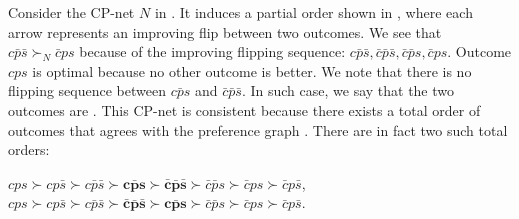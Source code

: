 Consider the CP-net $N$ in .
It induces a partial order shown in ,
where each arrow represents an improving flip between two outcomes.
We see that $c\bar{p}\bar{s} \succ_N \bar{c}ps$
because of the improving flipping sequence:
$c\bar{p}\bar{s},\bar{c}\bar{p}\bar{s},\bar{c}\bar{p}s,\bar{c}ps$.
Outcome $cps$ is optimal because no other outcome is
better.
We note that there is no flipping sequence between
$c\bar{p}s$ and $\bar{c}\bar{p}\bar{s}$.
In such case, we say that the two outcomes are .
This CP-net is consistent because there exists a total order
of outcomes that agrees with the preference graph .
There are in fact two such total orders:

\begin{center}
	$cps \succ cp\bar{s} \succ c\bar{p}\bar{s} 
		\succ \bm{c\bar{p}s} \succ \bm{\bar{c}\bar{p}\bar{s}} 
		\succ \bar{c}\bar{p}s \succ \bar{c}ps \succ \bar{c}p\bar{s}$,\\
	$cps \succ cp\bar{s} \succ c\bar{p}\bar{s} 
		\succ \bm{\bar{c}\bar{p}\bar{s}} \succ \bm{c\bar{p}s}
		\succ \bar{c}\bar{p}s \succ \bar{c}ps \succ \bar{c}p\bar{s}$.
\end{center}


